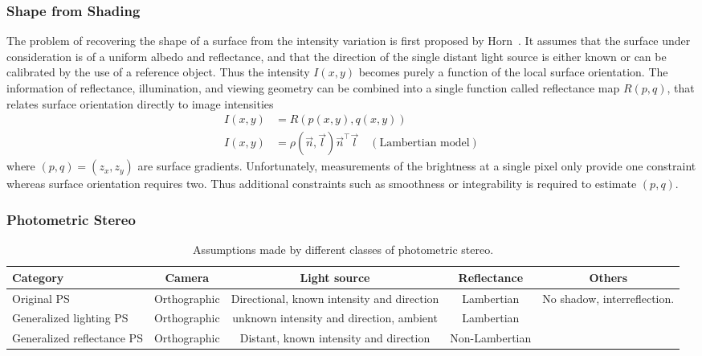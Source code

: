 \subsubsection{Shape from Shading}
The problem of recovering the shape of a surface from the intensity variation is first proposed by Horn~\cite{horn1970shape}. It assumes that the surface under consideration is of a uniform albedo and reflectance, and that the direction of the single distant light source is either known or can be calibrated by the use of a reference object. Thus the intensity $I(x,y)$ becomes purely a function of the local surface orientation. The information of reflectance, illumination, and viewing geometry can be combined into a single function called reflectance map $R(p, q)$, that relates surface orientation directly to image intensities
\begin{align*}
I(x, y) &= R(p(x, y), q(x, y))\\
I(x, y) &= \rho(\vec{n},\vec{l})\vec{n}^\top\vec{l} \quad (\text{Lambertian model})
\end{align*}
where $(p, q) = (z_x, z_y)$ are surface gradients. Unfortunately, measurements of the brightness at a single pixel only provide one constraint whereas surface orientation requires two. Thus additional constraints such as smoothness or integrability is required to estimate $(p, q)$.

\subsubsection{Photometric Stereo}
\begin{table}[h]
  \centering
  \begin{tabular}{l|*{4}{c}}
  \hline
  \textbf{Category} & Camera & Light source & Reflectance & Others\\
  \hline
  Original PS & Orthographic & Directional, known intensity and direction & Lambertian & No shadow, interreflection.\\
  Generalized lighting PS & Orthographic & unknown intensity and direction, ambient & Lambertian & \\
  Generalized reflectance PS & Orthographic & Distant, known intensity and direction & Non-Lambertian & \\
  \hline
  \end{tabular}
  \caption{Assumptions made by different classes of photometric stereo.}
  \label{tab:ps_assumptions}
\end{table}

